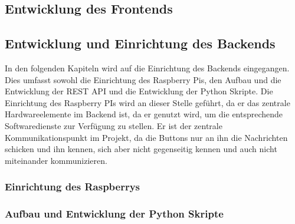\newpage

\subsection{Entwicklung des Frontends}  
\label{sec:Entwicklung der Frontends-1} 



\newpage

\subsection{Entwicklung und Einrichtung des Backends}  
\label{sec:Entwicklung und Einrichtung des Backends-1} 

In den folgenden Kapiteln wird auf die Einrichtung des Backends eingegangen. Dies umfasst sowohl die Einrichtung des Raspberry Pis, den Aufbau und die Entwicklung der \ac{REST} \ac{API} und die Entwicklung der Python Skripte. Die Einrichtung des Raspberry PIs wird an dieser Stelle geführt, da er das zentrale Hardwareelemente im Backend ist, da er genutzt wird, um die entsprechende Softwaredienste zur Verfügung zu stellen. Er ist der zentrale Kommunikationspunkt im Projekt, da die Buttons nur an ihn die Nachrichten schicken und ihn kennen, sich aber nicht gegenseitig kennen und auch nicht miteinander kommunizieren. 

\subsubsection{Einrichtung des Raspberrys}  
\label{sec:Einrichtung des Raspberrys-1}





\subsubsection{Aufbau und Entwicklung der Python Skripte}  
\label{sec:Aufbau und Entwicklung der Python Skripte-1}



\newpage